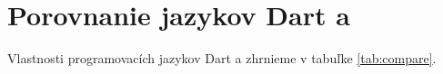 





\section{Porovnanie jazykov Dart a \JS{}}
Vlastnosti programovacích jazykov Dart a \JS{} zhrnieme v tabuľke \ref{tab:compare}. 

